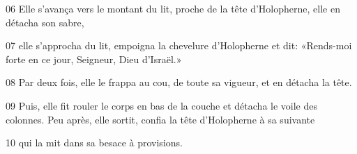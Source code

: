 
06 Elle s'avança vers le montant du lit, proche de la tête d'Holopherne, elle en détacha son sabre,

07 elle s'approcha du lit, empoigna la chevelure d'Holopherne et dit: «Rends-moi forte en ce jour, Seigneur, Dieu d'Israël.»

08 Par deux fois, elle le frappa au cou, de toute sa vigueur, et en détacha la tête.

09 Puis, elle fit rouler le corps en bas de la couche et détacha le voile des colonnes. Peu après, elle sortit, confia la tête d'Holopherne à sa suivante

10 qui la mit dans sa besace à provisions.